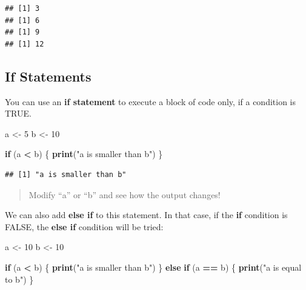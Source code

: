 \documentclass[
]{book}
\newenvironment{Shaded}{\begin{snugshade}}{\end{snugshade}}
\newcommand{\ControlFlowTok}[1]{\textcolor[rgb]{0.13,0.29,0.53}{\textbf{#1}}}
\newcommand{\DecValTok}[1]{\textcolor[rgb]{0.00,0.00,0.81}{#1}}
\newcommand{\FunctionTok}[1]{\textcolor[rgb]{0.13,0.29,0.53}{\textbf{#1}}}
\newcommand{\NormalTok}[1]{#1}
\newcommand{\OtherTok}[1]{\textcolor[rgb]{0.56,0.35,0.01}{#1}}
\newcommand{\SpecialCharTok}[1]{\textcolor[rgb]{0.81,0.36,0.00}{\textbf{#1}}}
\newcommand{\StringTok}[1]{\textcolor[rgb]{0.31,0.60,0.02}{#1}}
\begin{document}
\begin{verbatim}
## [1] 3
## [1] 6
## [1] 9
## [1] 12
\end{verbatim}

\hypertarget{if-statements}{%
\subsection*{If Statements}\label{if-statements}}

You can use an \textbf{if statement} to execute a block of code only, if a condition is TRUE.

\begin{Shaded}
\begin{Highlighting}[]
\NormalTok{a }\OtherTok{\textless{}{-}} \DecValTok{5}
\NormalTok{b }\OtherTok{\textless{}{-}} \DecValTok{10}

\ControlFlowTok{if}\NormalTok{ (a }\SpecialCharTok{\textless{}}\NormalTok{ b) \{}
  \FunctionTok{print}\NormalTok{(}\StringTok{"a is smaller than b"}\NormalTok{)}
\NormalTok{\}}
\end{Highlighting}
\end{Shaded}

\begin{verbatim}
## [1] "a is smaller than b"
\end{verbatim}

\begin{quote}
Modify ``a'' or ``b'' and see how the output changes!
\end{quote}

We can also add \textbf{else if} to this statement.
In that case, if the \textbf{if} condition is FALSE, the \textbf{else if} condition will be tried:

\begin{Shaded}
\begin{Highlighting}[]
\NormalTok{a }\OtherTok{\textless{}{-}} \DecValTok{10}
\NormalTok{b }\OtherTok{\textless{}{-}} \DecValTok{10}

\ControlFlowTok{if}\NormalTok{ (a }\SpecialCharTok{\textless{}}\NormalTok{ b) \{}
  \FunctionTok{print}\NormalTok{(}\StringTok{"a is smaller than b"}\NormalTok{)}
\NormalTok{\} }\ControlFlowTok{else} \ControlFlowTok{if}\NormalTok{ (a }\SpecialCharTok{==}\NormalTok{ b) \{}
  \FunctionTok{print}\NormalTok{(}\StringTok{"a is equal to b"}\NormalTok{)}
\NormalTok{\}}
\end{Highlighting}
\end{Shaded}
\end{document}
